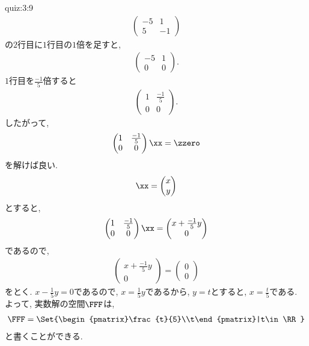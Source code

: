 \begin{answerof}{quiz:3:9} 
  \begin{align*}
    \begin{pmatrix}-5&1\\5&-1\end{pmatrix}
  \end{align*}
  の$2$行目に$1$行目の$1$倍を足すと,
 \begin{align*}
    \begin{pmatrix}-5&1\\0&0\end{pmatrix}.
  \end{align*}
 $1$行目を$\frac{-1}{5}$倍すると
 \begin{align*}
    \begin{pmatrix}1&\frac{-1}{5}\\0&0\end{pmatrix}.
  \end{align*}
 したがって,
  \begin{align*}
    \begin{pmatrix}1&\frac{-1}{5}\\0&0\end{pmatrix}
    \xx=\zzero
  \end{align*}
  を解けば良い.
  \begin{align*}
    \xx=
    \begin{pmatrix}x\\y\end{pmatrix}
  \end{align*}
  とすると,
  \begin{align*}
    \begin{pmatrix}1&\frac{-1}{5}\\0&0\end{pmatrix}
      \xx
      =
    \begin{pmatrix}x+\frac{-1}{5}y\\0\end{pmatrix}
  \end{align*}
  であるので,
  \begin{align*}
    \begin{pmatrix}x+\frac{-1}{5}y\\0\end{pmatrix}=
      \begin{pmatrix}0\\0\end{pmatrix}
  \end{align*}
  をとく. $x-\frac{1}{5}y=0$であるので,
  $x=\frac{1}{5}y$であるから,
  $y=t$とすると, $x=\frac{t}{5}$である.
  よって, 実数解の空間$\FFF$は,
  \begin{align*}
    \FFF=
    \Set{\begin{pmatrix}\frac{t}{5}\\t\end{pmatrix}|t\in\RR}
  \end{align*}
  と書くことができる.  
\end{answerof}

